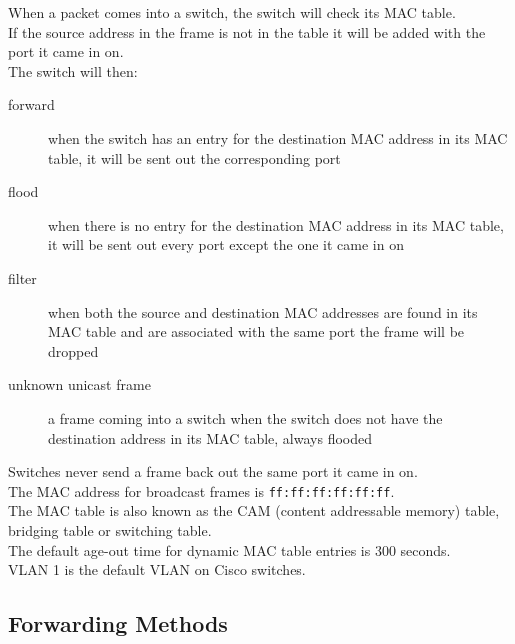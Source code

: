 \documentclass{article}
\begin{document}
When a packet comes into a switch, the switch will check its MAC table.\\

If the source address in the frame is not in the table it will be added
with the port it came in on.\\

The switch will then:\\

\begin{description}

\item[forward]
when the switch has an entry for the destination MAC address in its MAC table,
it will be sent out the corresponding port

\item[flood]
when there is no entry for the destination MAC address in its MAC table,
it will be sent out every port except the one it came in on

\item[filter]
when both the source and destination MAC addresses are found in its MAC table
and are associated with the same port the frame will be dropped

\end{description}

\begin{description}

\item[unknown unicast frame]
a frame coming into a switch when the switch does not have the destination
address in its MAC table, always flooded

\end{description}

Switches never send a frame back out the same port it came in on.\\

The MAC address for broadcast frames is \texttt{ff:ff:ff:ff:ff:ff}.\\

The MAC table is also known as the CAM (content addressable memory) table,
bridging table or switching table.\\

The default age-out time for dynamic MAC table entries is 300 seconds.\\

VLAN 1 is the default VLAN on Cisco switches.

\subsection{Forwarding Methods}
\end{document}
